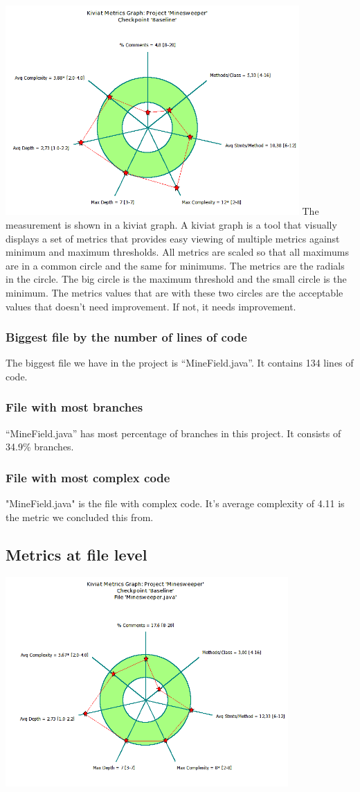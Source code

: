 \documentclass[UKenglish]{article}  %
\begin{document}
\includegraphics[height=8cm]{project-kiviat-metrics-graph-original.png}
The measurement is shown in a kiviat graph. A kiviat graph is a tool that
visually displays a set of metrics that provides easy viewing of multiple
metrics against minimum and maximum thresholds.  All metrics are scaled so
that all maximums are in a common circle and the same for minimums.
The metrics are the radials in the circle. The big circle is the maximum
threshold and the small circle is the minimum. The metrics values that are
with these two circles are the acceptable values that doesn’t need
improvement. If not, it needs improvement.

\subsubsection{Biggest file by the number of lines of code}
The biggest file we have in the project is “MineField.java”. It contains 134 lines of code.

\subsubsection{File with most branches}
“MineField.java” has most percentage of branches in this project. It consists of 34.9\% branches.

\subsubsection{File with most complex code}
"MineField.java" is the file with complex code. It's average complexity of 4.11 is the metric we concluded this from.

\subsection{Metrics at file level}

\includegraphics[height=8cm]{Minesweeper_java-kiviat-metrics-graph-original.png}
\end{document}
